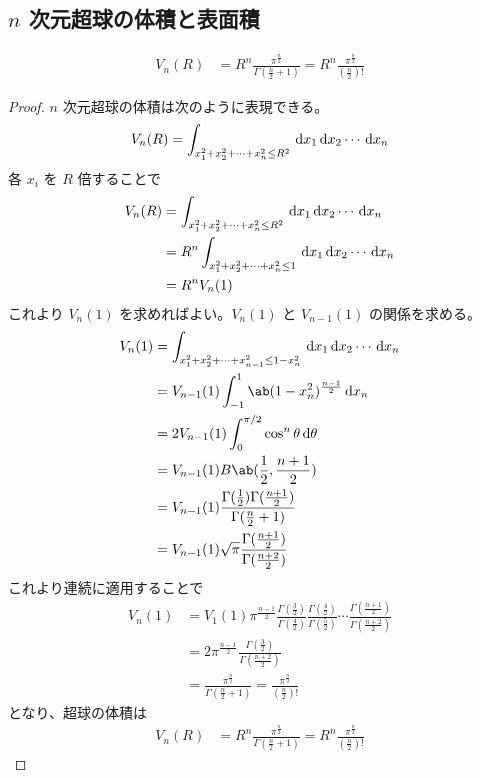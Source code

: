 \documentclass[uplatex,diffipdfmx,a4paper,11pt]{jlreq}
\begin{document}
\subsection{$n$ 次元超球の体積と表面積}
\begin{theorem}
  \begin{align}
    V_n(R) & = R^n\frac{\pi^{\frac{n}{2}}}{\Gamma(\frac{n}{2}+1)} = R^n\frac{\pi^{\frac{n}{2}}}{(\frac{n}{2})!}
  \end{align}
\end{theorem}
\begin{proof}
  $n$ 次元超球の体積は次のように表現できる。
  \begin{align}
    V_n(R) = \int_{x_1^2 + x_2^2 + \cdots + x_n^2\leq R^2}\dl{x_1}\dl{x_2}\cdots\dl{x_n}
  \end{align}
  各 $x_i$ を $R$ 倍することで
  \begin{align}
    V_n(R) & = \int_{x_1^2 + x_2^2 + \cdots + x_n^2\leq R^2}\dl{x_1}\dl{x_2}\cdots\dl{x_n}  \\
           & = R^n\int_{x_1^2 + x_2^2 + \cdots + x_n^2\leq 1}\dl{x_1}\dl{x_2}\cdots\dl{x_n} \\
           & = R^nV_n(1)
  \end{align}
  これより $V_n(1)$ を求めればよい。$V_n(1)$ と $V_{n-1}(1)$ の関係を求める。
  \begin{align}
    V_n(1) & = \int_{x_1^2 + x_2^2 + \cdots + x_{n-1}^2\leq 1 - x_n^2}\dl{x_1}\dl{x_2}\cdots\dl{x_n} \\
           & = V_{n-1}(1)\int_{-1}^1\ab(1 - x_n^2)^{\frac{n-1}{2}}\dl{x_n}                           \\
           & = 2V_{n-1}(1)\int_0^{\pi/2}\cos^{n}\theta\dl{\theta}                                    \\
           & = V_{n-1}(1)B\ab(\frac{1}{2}, \frac{n+1}{2})                                            \\
           & = V_{n-1}(1)\frac{\Gamma(\frac{1}{2})\Gamma(\frac{n+1}{2})}{\Gamma(\frac{n}{2}+1)}      \\
           & = V_{n-1}(1)\sqrt{\pi}\frac{\Gamma(\frac{n+1}{2})}{\Gamma(\frac{n+2}{2})}
  \end{align}
  これより連続に適用することで
  \begin{align}
    V_n(1) & = V_{1}(1)\pi^{\frac{n-1}{2}}\frac{\Gamma(\frac{3}{2})}{\Gamma(\frac{4}{2})}\frac{\Gamma(\frac{4}{2})}{\Gamma(\frac{5}{2})}\cdots\frac{\Gamma(\frac{n+1}{2})}{\Gamma(\frac{n+2}{2})} \\
           & = 2\pi^{\frac{n-1}{2}}\frac{\Gamma(\frac{3}{2})}{\Gamma(\frac{n+2}{2})}                                                                                                              \\
           & = \frac{\pi^{\frac{n}{2}}}{\Gamma(\frac{n}{2}+1)} = \frac{\pi^{\frac{n}{2}}}{(\frac{n}{2})!}
  \end{align}
  となり、超球の体積は
  \begin{align}
    V_n(R) & = R^n\frac{\pi^{\frac{n}{2}}}{\Gamma(\frac{n}{2}+1)} = R^n\frac{\pi^{\frac{n}{2}}}{(\frac{n}{2})!}
  \end{align}
\end{proof}
\end{document}
